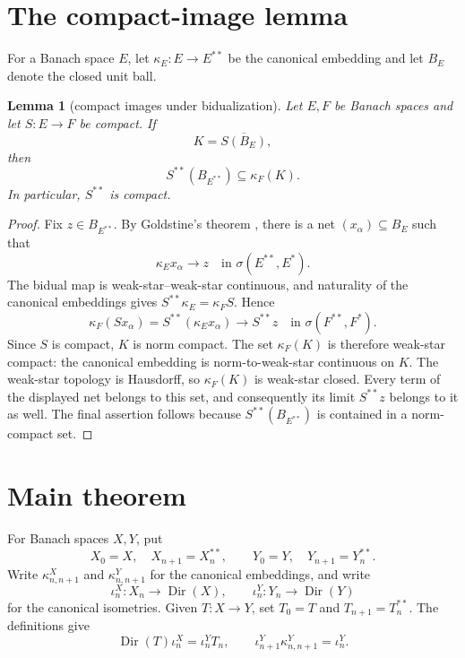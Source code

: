 \documentclass[11pt]{article}
\newtheorem{lemma}{Lemma}
\newcommand{\Dir}{\operatorname{Dir}}
\begin{document}
\section{The compact-image lemma}

For a Banach space \(E\), let
\(\kappa_E:E\to E^{**}\) be the canonical embedding and let \(B_E\) denote
the closed unit ball.

\begin{lemma}[compact images under bidualization]\label{lem:image}
Let \(E,F\) be Banach spaces and let \(S:E\to F\) be compact. If
\[
 K=\overline{S(B_E)},
\]
then
\[
 S^{**}(B_{E^{**}})\subseteq \kappa_F(K).
\]
In particular, \(S^{**}\) is compact.
\end{lemma}

\begin{proof}
Fix \(z\in B_{E^{**}}\). By Goldstine's theorem
\cite[Chapter~2]{megginson}, there is a net \((x_\alpha)\subseteq B_E\) such
that
\[
 \kappa_E x_\alpha\longrightarrow z
 \quad\text{in }\sigma(E^{**},E^*).
\]
The bidual map is weak-star--weak-star continuous, and naturality of the
canonical embeddings gives \(S^{**}\kappa_E=\kappa_F S\). Hence
\[
 \kappa_F(Sx_\alpha)=S^{**}(\kappa_E x_\alpha)
 \longrightarrow S^{**}z
 \quad\text{in }\sigma(F^{**},F^*).
\]
Since \(S\) is compact, \(K\) is norm compact. The set \(\kappa_F(K)\) is
therefore weak-star compact: the canonical embedding is norm-to-weak-star
continuous on \(K\). The weak-star topology is Hausdorff, so
\(\kappa_F(K)\) is weak-star closed. Every term of the displayed net belongs
to this set, and consequently its limit \(S^{**}z\) belongs to it as well.
The final assertion follows because \(S^{**}(B_{E^{**}})\) is contained in a
norm-compact set.
\end{proof}

\section{Main theorem}

For Banach spaces \(X,Y\), put
\[
 X_0=X,\quad X_{n+1}=X_n^{**},
 \qquad
 Y_0=Y,\quad Y_{n+1}=Y_n^{**}.
\]
Write \(\kappa^X_{n,n+1}\) and \(\kappa^Y_{n,n+1}\) for the canonical
embeddings, and write
\[
 \iota_n^X:X_n\to\Dir(X),
 \qquad
 \iota_n^Y:Y_n\to\Dir(Y)
\]
for the canonical isometries. Given \(T:X\to Y\), set
\(T_0=T\) and \(T_{n+1}=T_n^{**}\). The definitions give
\begin{equation}\label{eq:naturality}
 \Dir(T)\iota_n^X=\iota_n^Y T_n,
 \qquad
 \iota_{n+1}^Y\kappa^Y_{n,n+1}=\iota_n^Y.
\end{equation}
\end{document}
